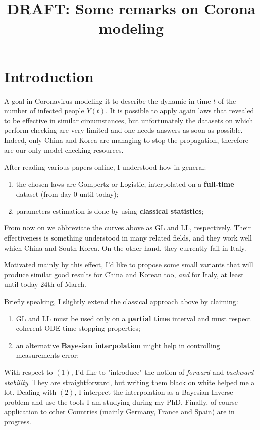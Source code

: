 \documentclass[6pt]{article}
\title {DRAFT: Some remarks on Corona modeling}
\begin{document}
\maketitle
\section{Introduction}
A goal in Coronavirus modeling it to describe the dynamic in time $t$ of the number of infected people $Y(t)$.
It is possible to apply again laws that revealed to be effective in similar circumstances, but unfortunately the datasets
on which perform checking are very limited and one needs answers as soon as possible.
Indeed, only China and Korea are managing to stop the propagation, therefore are our only model-checking resources.

After reading various papers online, I understood how in general:

\begin{enumerate}
\item the chosen laws are Gompertz or Logistic, interpolated on a \textbf{full-time} dataset (from day 0 until today);
\item parameters estimation is done by using \textbf{classical statistics};
\end{enumerate}

From now on we abbreviate the curves above as GL and LL, respectively. Their effectiveness is something understood in many related fields,
and they work well which China and South Korea. On the other hand, they currently fail in Italy.

Motivated mainly by this effect, I'd like to propose some small variants that will produce similar good results for China and Korean too, \emph{and}
for Italy, at least until today 24th of March.

Briefly speaking, I slightly extend the classical approach above by claiming:
\begin{enumerate}
\item GL and LL must be used only on a \textbf{partial time} interval and must respect coherent ODE time stopping properties;
\item an alternative \textbf{Bayesian interpolation} might help in controlling measurements error;
\end{enumerate}

With respect to $(1)$, I'd like to "introduce" the notion of \emph{forward} and \emph{backward stability}. They are straightforward, but writing them black on white
helped me a lot. Dealing with $(2)$, I interpret the interpolation as a Bayesian Inverse problem and use the tools I am studying during my PhD.
Finally, of course application to other Countries (mainly Germany, France and Spain) are in progress.
\end{document}
